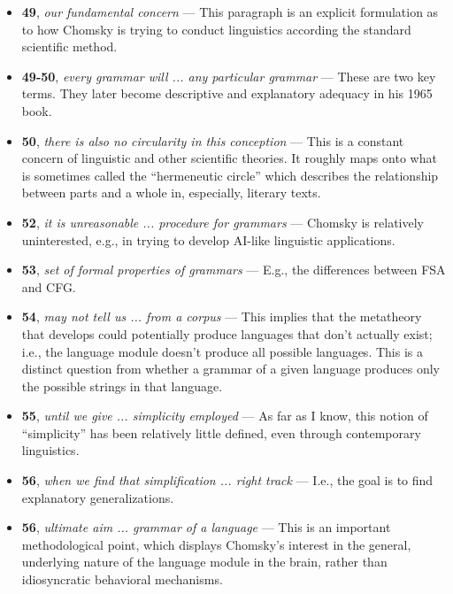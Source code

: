 \documentclass[12pt]{article}
\begin{document}
\begin{itemize}

\item \textbf{49}, \textit{our fundamental concern} --- This paragraph is an explicit formulation as to how Chomsky is trying to conduct linguistics according the standard scientific method.

\item \textbf{49-50}, \textit{every grammar will ... any particular grammar} --- These are two key terms. They later become descriptive and explanatory adequacy in his 1965 book.

\item \textbf{50}, \textit{there is also no circularity in this conception} --- This is a constant concern of linguistic and other scientific theories. It roughly maps onto what is sometimes called the ``hermeneutic circle'' which describes the relationship between parts and a whole in, especially, literary texts.

\item \textbf{52}, \textit{it is unreasonable ... procedure for grammars} --- Chomsky is relatively uninterested, e.g., in trying to develop AI-like linguistic applications.

\item \textbf{53}, \textit{set of formal properties of grammars} --- E.g., the differences between FSA and CFG.

\item \textbf{54}, \textit{may not tell us ... from a corpus} --- This implies that the metatheory that develops could potentially produce languages that don't actually exist; i.e., the language module doesn't produce all possible languages. This is a distinct question from whether a grammar of a given language produces only the possible strings in that language.

\item \textbf{55}, \textit{until we give ... simplicity employed} --- As far as I know, this notion of ``simplicity'' has been relatively little defined, even through contemporary linguistics.

\item \textbf{56}, \textit{when we find that simplification ... right track} --- I.e., the goal is to find explanatory generalizations.

\item \textbf{56}, \textit{ultimate aim ... grammar of a language} --- This is an important methodological point, which displays Chomsky's interest in the general, underlying nature of the language module in the brain, rather than idiosyncratic behavioral mechanisms.


\end{itemize}
\end{document}

